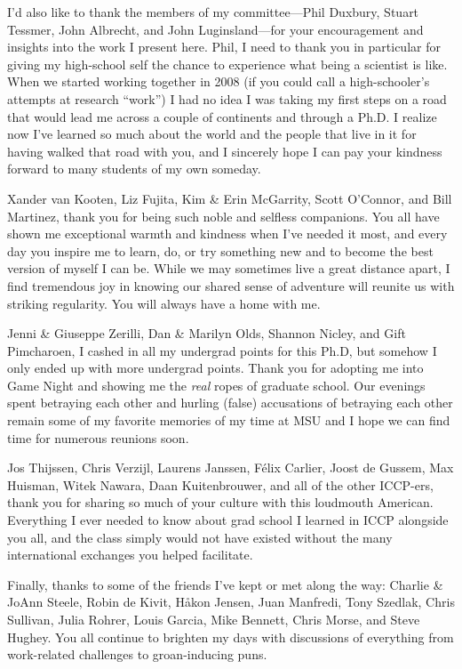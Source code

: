 \documentclass[mixedtoc]{msu-thesis-custom}
\begin{document}
I'd also like to thank the members of my committee---Phil Duxbury, Stuart
Tessmer, John Albrecht, and John Luginsland---for your encouragement and
insights into the work I present here. Phil, I need to thank you in particular
for giving my high-school self the chance to experience what being a scientist
is like. When we started working together in 2008 (if you could call a
high-schooler's attempts at research ``work'') I had no idea I was taking my
first steps on a road that would lead me across a couple of continents and
through a Ph.D. I realize now I've learned so much about the world and the
people that live in it for having walked that road with you, and I sincerely
hope I can pay your kindness forward to many students of my own someday.

Xander van Kooten, Liz Fujita, Kim \& Erin McGarrity, Scott O'Connor, and Bill
Martinez, thank you for being such noble and selfless companions. You all have
shown me exceptional warmth and kindness when I've needed it most, and every
day you inspire me to learn, do, or try something new and to become the best
version of myself I can be. While we may sometimes live a great distance apart,
I find tremendous joy in knowing our shared sense of adventure will reunite us
with striking regularity. You will always have a home with me.

Jenni \& Giuseppe Zerilli, Dan \& Marilyn Olds, Shannon Nicley, and Gift
Pimcharoen, I cashed in all my undergrad points for this Ph.D, but somehow I
only ended up with more undergrad points. Thank you for adopting me into Game
Night and showing me the \emph{real} ropes of graduate school. Our evenings
spent betraying each other and hurling (false) accusations of betraying each
other remain some of my favorite memories of my time at MSU and I hope we can
find time for numerous reunions soon.

Jos Thijssen, Chris Verzijl, Laurens Janssen, F\'elix Carlier, Joost de Gussem,
Max Huisman, Witek Nawara, Daan Kuitenbrouwer, and all of the other ICCP-ers,
thank you for sharing so much of your culture with this loudmouth American.
Everything I ever needed to know about grad school I learned in ICCP alongside
you all, and the class simply would not have existed without the many 
international exchanges you helped facilitate.

Finally, thanks to some of the friends I've kept or met along the way: Charlie
\& JoAnn Steele, Robin de Kivit, H\aa kon Jensen, Juan Manfredi, Tony Szedlak,
Chris Sullivan, Julia Rohrer, Louis Garcia, Mike Bennett, Chris Morse, and
Steve Hughey. You all continue to brighten my days with discussions of
everything from work-related challenges to groan-inducing puns.
\end{document}
